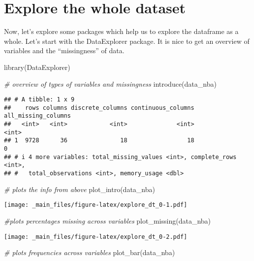 \documentclass[
]{book}
\newenvironment{Shaded}{\begin{snugshade}}{\end{snugshade}}
\newcommand{\CommentTok}[1]{\textcolor[rgb]{0.56,0.35,0.01}{\textit{#1}}}
\newcommand{\FunctionTok}[1]{\textcolor[rgb]{0.00,0.00,0.00}{#1}}
\newcommand{\FunctionTok}[1]{\textcolor[rgb]{0.13,0.29,0.53}{\textbf{#1}}}
\newcommand{\NormalTok}[1]{#1}
\begin{document}
\hypertarget{explore-the-whole-dataset}{%
\section{Explore the whole dataset}\label{explore-the-whole-dataset}}

Now, let's explore some packages which help us to explore the dataframe as a whole.
Let's start with the DataExplorer package. It is nice to get an overview of variables and the ``missingness'' of data.

\begin{Shaded}
\begin{Highlighting}[]
\FunctionTok{library}\NormalTok{(DataExplorer)}

\CommentTok{\# overview of types of variables and missingness}
\FunctionTok{introduce}\NormalTok{(data\_nba)}
\end{Highlighting}
\end{Shaded}

\begin{verbatim}
## # A tibble: 1 x 9
##    rows columns discrete_columns continuous_columns all_missing_columns
##   <int>   <int>            <int>              <int>               <int>
## 1  9728      36               18                 18                   0
## # i 4 more variables: total_missing_values <int>, complete_rows <int>,
## #   total_observations <int>, memory_usage <dbl>
\end{verbatim}

\begin{Shaded}
\begin{Highlighting}[]
\CommentTok{\# plots the info from above}
\FunctionTok{plot\_intro}\NormalTok{(data\_nba)}
\end{Highlighting}
\end{Shaded}

\texttt{[image: \_main\_files/figure-latex/explore\_dt\_0-1.pdf]}

\begin{Shaded}
\begin{Highlighting}[]
\CommentTok{\#plots percentages missing across variables}
\FunctionTok{plot\_missing}\NormalTok{(data\_nba)}
\end{Highlighting}
\end{Shaded}

\texttt{[image: \_main\_files/figure-latex/explore\_dt\_0-2.pdf]}

\begin{Shaded}
\begin{Highlighting}[]
\CommentTok{\# plots frequencies across variables}
\FunctionTok{plot\_bar}\NormalTok{(data\_nba)}
\end{Highlighting}
\end{Shaded}
\end{document}
